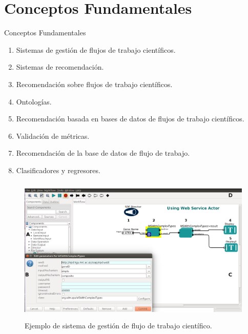 \section{Conceptos Fundamentales}

\begin{frame}
	\begin{block}{Conceptos Fundamentales}
		 \begin{enumerate}
		  \item Sistemas de gestión de flujos de trabajo científicos.
		  \item Sistemas de recomendación.
		  \item Recomendación sobre flujos de trabajo científicos.
		  \item Ontologías.
		  \item Recomendación basada en bases de datos de flujos de trabajo científicos.
		  \item Validación de métricas.
		  \item Recomendación de la base de datos de flujo de trabajo.
		  \item Clasificadores y regresores.
		 \end{enumerate}
	\end{block}
\end{frame}


\begin{frame}
	\begin{figure}[!htb]
		\centering	  				
		\includegraphics[height=7cm]{./secoes/ConceitosFundamentais/webService.png}
		\caption{Ejemplo de sistema de gestión de flujo de trabajo científico.}
		\label{fig_sistema_gerenciador_workflow_cientifico}
 	\end{figure}
\end{frame}


